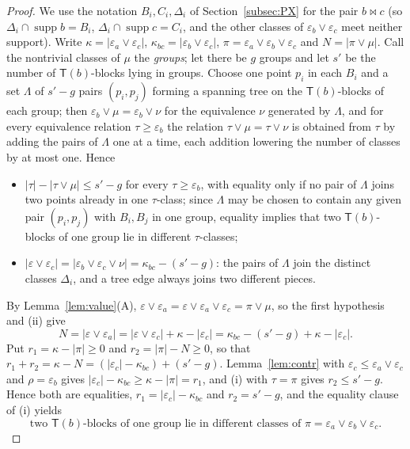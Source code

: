 \documentclass[11pt]{amsart}
\theoremstyle{definition}
\newcommand{\supp}{\operatorname{supp}}
\newcommand{\T}{\mathsf{T}}
\newcommand{\mt}{\bowtie}      %
\begin{document}
\begin{proof}
We use the notation $B_i,C_i,\Delta_i$ of Section~\ref{subsec:PX} for the pair $b\mt c$ (so $\Delta_i\cap\supp b=B_i$, $\Delta_i\cap\supp c=C_i$, and the other classes of $\varepsilon_b\vee\varepsilon_c$ meet neither support). Write $\kappa=|\varepsilon_a\vee\varepsilon_c|$, $\kappa_{bc}=|\varepsilon_b\vee\varepsilon_c|$, $\pi=\varepsilon_a\vee\varepsilon_b\vee\varepsilon_c$ and $N=|\pi\vee\mu|$. Call the nontrivial classes of $\mu$ the \emph{groups}; let there be $g$ groups and let $s'$ be the number of $\T(b)$-blocks lying in groups. Choose one point $p_i$ in each $B_i$ and a set $\Lambda$ of $s'-g$ pairs $(p_i,p_j)$ forming a spanning tree on the $\T(b)$-blocks of each group; then $\varepsilon_b\vee\mu=\varepsilon_b\vee\nu$ for the equivalence $\nu$ generated by $\Lambda$, and for every equivalence relation $\tau\ge\varepsilon_b$ the relation $\tau\vee\mu=\tau\vee\nu$ is obtained from $\tau$ by adding the pairs of $\Lambda$ one at a time, each addition lowering the number of classes by at most one. Hence
\begin{itemize}[nosep]
\item[(i)] $|\tau|-|\tau\vee\mu|\le s'-g$ for every $\tau\ge\varepsilon_b$, with equality only if no pair of $\Lambda$ joins two points already in one $\tau$-class; since $\Lambda$ may be chosen to contain any given pair $(p_i,p_j)$ with $B_i,B_j$ in one group, equality implies that two $\T(b)$-blocks of one group lie in different $\tau$-classes;
\item[(ii)] $|\varepsilon\vee\varepsilon_c|=|\varepsilon_b\vee\varepsilon_c\vee\nu|=\kappa_{bc}-(s'-g)$: the pairs of $\Lambda$ join the distinct classes $\Delta_i$, and a tree edge always joins two different pieces.
\end{itemize}
By Lemma~\ref{lem:value}(A), $\varepsilon\vee\varepsilon_a=\varepsilon\vee\varepsilon_a\vee\varepsilon_c=\pi\vee\mu$, so the first hypothesis and (ii) give
\begin{equation}\label{eq:N}
N=|\varepsilon\vee\varepsilon_a|=|\varepsilon\vee\varepsilon_c|+\kappa-|\varepsilon_c|=\kappa_{bc}-(s'-g)+\kappa-|\varepsilon_c|.
\end{equation}
Put $r_1=\kappa-|\pi|\ge0$ and $r_2=|\pi|-N\ge0$, so that $r_1+r_2=\kappa-N=(|\varepsilon_c|-\kappa_{bc})+(s'-g)$. Lemma~\ref{lem:contr} with $\varepsilon_c\le\varepsilon_a\vee\varepsilon_c$ and $\rho=\varepsilon_b$ gives $|\varepsilon_c|-\kappa_{bc}\ge\kappa-|\pi|=r_1$, and (i) with $\tau=\pi$ gives $r_2\le s'-g$. Hence both are equalities, $r_1=|\varepsilon_c|-\kappa_{bc}$ and $r_2=s'-g$, and the equality clause of (i) yields
\begin{equation}\label{eq:star}
\text{two $\T(b)$-blocks of one group lie in different classes of }\pi=\varepsilon_a\vee\varepsilon_b\vee\varepsilon_c.
\end{equation}


\end{proof}
\end{document}
